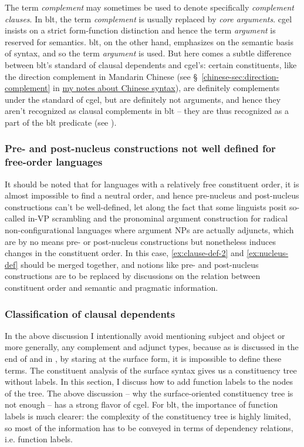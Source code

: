 \documentclass[UTF8, a4paper, oneside, scheme=plain]{ctexart}
\newcommand*{\citesec}[1]{\S~{#1}}
\newcommand*{\term}[1]{\emph{#1}}
\newcommand{\chinesenote}{\href{../Chinese/main.pdf}{my notes about Chinese syntax}}
\begin{document}
The term \term{complement} may sometimes be used to denote specifically \term{complement clauses}. %
In \ac{blt}, the term \term{complement} is usually replaced by \term{core arguments}.
\ac{cgel} insists on a strict form-function distinction 
and hence the term \term{argument} is reserved for semantics.
\ac{blt}, on the other hand, emphasizes on the semantic basis of syntax, 
and so the term \term{argument} is used.
But here comes a subtle difference between \ac{blt}'s standard of clausal dependents and \ac{cgel}'s:
certain constituents, like the direction complement in Mandarin Chinese 
(see \citesec{\ref{chinese-sec:direction-complement}} in \chinesenote),
are definitely complements under the standard of \ac{cgel},
but are definitely not arguments, 
and hence they aren't recognized as clausal complements in \ac{blt}
-- they are thus recognized as a part of the \ac{blt} predicate (see ).

\subsubsection{Pre- and post-nucleus constructions not well defined for free-order languages}\label{sec:free-order-blt}

It should be noted that for languages with a relatively free constituent order,
it is almost impossible to find a neutral order, 
and hence pre-nucleus and post-nucleus constructions 
can't be well-defined,
let along the fact that some linguists posit so-called in-VP scrambling
and the pronominal argument construction for radical non-configurational languages
where argument NPs are actually adjuncts,
which are by no means pre- or post-nucleus constructions 
but nonetheless induces changes in the constituent order.
In this case, \eqref{ex:clause-def-2} and \eqref{ex:nucleus-def} should be merged together,
and notions like pre- and post-nucleus constructions are to be replaced by 
discussions on the relation between constituent order and semantic and pragmatic information.

\subsubsection{Classification of clausal dependents}\label{sec:complement-type-necessary}

In the above discussion I intentionally avoid mentioning subject and object
or more generally, any complement and adjunct types,
because as is discussed in the end of 
and in ,
by staring at the surface form,
it is impossible to define these terms.
The constituent analysis of the surface syntax 
gives us a constituency tree without labels.
In this section, I discuss how to add function labels to the nodes of the tree.
The above discussion -- why the surface-oriented constituency tree is not enough -- 
has a strong flavor of \ac{cgel}.
For \ac{blt}, the importance of function labels is much clearer:
the complexity of the constituency tree is highly limited,
so most of the information has to be conveyed in terms of 
dependency relations, i.e. function labels.
\end{document}
